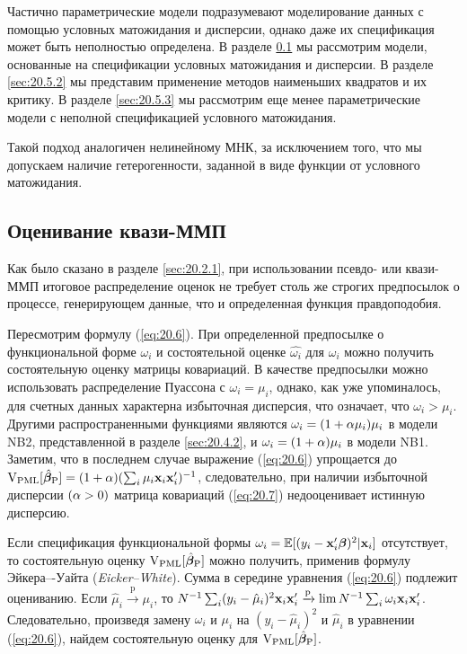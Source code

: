 \noindent
Частично параметрические модели подразумевают моделирование данных с помощью условных матожидания и дисперсии, однако даже их спецификация может быть неполностью определена. В разделе \ref{sec:20.5.1} мы рассмотрим модели, основанные на спецификации условных матожидания и дисперсии. В разделе \ref{sec:20.5.2} мы представим применение методов наименьших квадратов и их критику. В разделе \ref{sec:20.5.3} мы рассмотрим еще менее параметрические модели с неполной спецификацией условного матожидания.

Такой подход аналогичен нелинейному МНК, за исключением того, что мы допускаем наличие гетерогенности, заданной в виде функции от условного матожидания.


\subsection{Оценивание квази-ММП}\label{sec:20.5.1}

\noindent
Как было сказано в разделе \ref{sec:20.2.1}, при использовании псевдо- или квази-ММП итоговое распределение оценок не требует столь же строгих предпосылок о процессе, генерирующем данные, что и определенная функция правдоподобия.

Пересмотрим формулу (\ref{eq:20.6}). При определенной предпосылке о функциональной форме $\omega_i$ и состоятельной оценке $\hat{\omega_i}$ для $\omega_i$ можно получить состоятельную оценку матрицы ковариаций. В качестве предпосылки можно использовать распределение Пуассона с $\omega_i = \mu_i$, однако, как уже упоминалось, для счетных данных характерна избыточная дисперсия, что означает, что $\omega_i > \mu_i$. Другими распространенными функциями являются $\omega_i = (1 + \alpha \mu_i) \mu_i$ в модели NB2, представленной в разделе \ref{sec:20.4.2}, и $\omega_i = (1 + \alpha) \mu_i$ в модели NB1. Заметим, что в последнем случае выражение (\ref{eq:20.6}) упрощается до $\mathrm{V}_{\mathrm{PML}}[\hat{\bm{\beta}}_{\mathrm{P}}] = (1 + \alpha) (\sum_i \mu_i \mathbf{x}_i \mathbf{x}'_i)^{-1}$, следовательно, при наличии избыточной дисперсии $(\alpha > 0)$ матрица ковариаций (\ref{eq:20.7}) недооценивает истинную дисперсию.

Если спецификация функциональной формы $\omega_i = \mathbb{E}[(y_i - \mathbf{x}_i'\bm{\beta})^2|\mathbf{x}_i]$ отсутствует, то состоятельную оценку $\mathrm{V}_{\mathrm{PML}}[\hat{\bm{\beta}}_{\mathrm{P}}]$ можно получить, применив формулу Эйкера–-Уайта (\textit{Eicker--White}). Сумма в середине уравнения (\ref{eq:20.6}) подлежит оцениванию. Если $\hat{\mu}_i \xrightarrow{\text{p}} \mu_i$, то $N^{-1} \sum_i (y_i - \hat{\mu}_i)^2 \mathbf{x}_i \mathbf{x}'_i \xrightarrow{\text{p}} \lim N^{-1} \sum_i \omega_i \mathbf{x}_i \mathbf{x}'_i$. Следовательно, произведя замену $\omega_i$ и $\mu_i$ на $(y_i - \hat{\mu}_i)^2$ и $\hat{\mu}_i$ в уравнении (\ref{eq:20.6}), найдем состоятельную оценку для $\mathrm{V}_{\mathrm{PML}}[\hat{\bm{\beta}}_{\mathrm{P}}]$.

